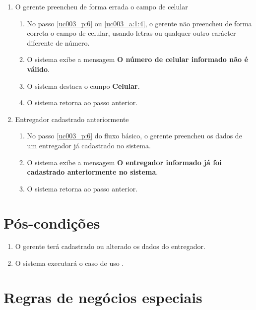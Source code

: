 \begin{enumerate}[label=E\arabic*]
	\item O gerente preencheu de forma errada o campo de celular \label{uc003_e:5}
	\begin{enumerate}[label*=.\arabic*]		
		\item[] No passo \ref{uc003_p:6} ou \ref{uc003_a:1:4}, o gerente não preencheu de forma correta o campo de celular, usando letras ou qualquer outro carácter diferente de número.		
		\item O sistema exibe a mensagem \textbf{O número de celular informado não é válido}.
		\item O sistema destaca o campo \textbf{Celular}.
		\item O sistema retorna ao passo anterior.
	\end{enumerate}	
	
	\item Entregador cadastrado anteriormente \label{uc003_e:6}
	\begin{enumerate}[label*=.\arabic*]
		\item[] No passo \ref{uc003_p:6} do fluxo básico, o gerente preencheu os dados de um entregador já cadastrado no sistema.
		\item O sistema exibe a mensagem \textbf{O entregador informado já foi cadastrado anteriormente no sistema}.
		\item O sistema retorna ao passo anterior.
	\end{enumerate}
\end{enumerate}

\section{Pós-condições}

\begin{enumerate}
	\item O gerente terá cadastrado ou alterado os dados do entregador.
	\item O sistema executará o caso de uso .
\end{enumerate}

\section{Regras de negócios especiais}

